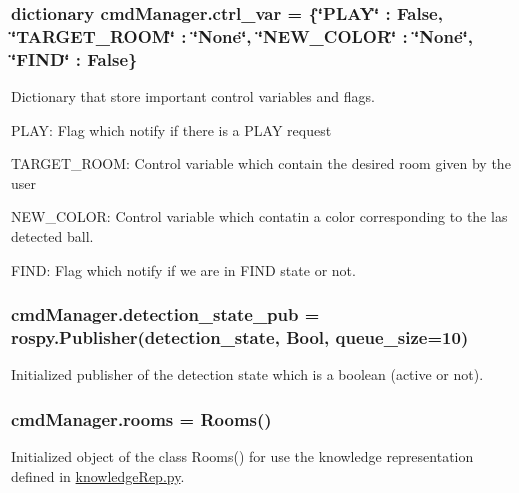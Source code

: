 \subsubsection[{\texorpdfstring{ctrl\+\_\+var}{ctrl_var}}]{\setlength{\rightskip}{0pt plus 5cm}dictionary cmd\+Manager.\+ctrl\+\_\+var = \{\char`\"{}P\+L\+AY\char`\"{} \+: False, \char`\"{}T\+A\+R\+G\+E\+T\+\_\+\+R\+O\+OM\char`\"{} \+: \char`\"{}None\char`\"{}, \char`\"{}N\+E\+W\+\_\+\+C\+O\+L\+OR\char`\"{} \+: \char`\"{}None\char`\"{}, \char`\"{}F\+I\+ND\char`\"{} \+: False\}}\hypertarget{namespacecmdManager_a927e4211865b745599afe42e9e8d7c8e}{}\label{namespacecmdManager_a927e4211865b745599afe42e9e8d7c8e}


Dictionary that store important control variables and flags. 


\begin{DoxyItemize}
\item P\+L\+AY\+: Flag which notify if there is a P\+L\+AY request
\item T\+A\+R\+G\+E\+T\+\_\+\+R\+O\+OM\+: Control variable which contain the desired room given by the user
\item N\+E\+W\+\_\+\+C\+O\+L\+OR\+: Control variable which contatin a color corresponding to the las detected ball.
\item F\+I\+ND\+: Flag which notify if we are in F\+I\+ND state or not. 
\end{DoxyItemize}
\subsubsection[{\texorpdfstring{detection\+\_\+state\+\_\+pub}{detection_state_pub}}]{\setlength{\rightskip}{0pt plus 5cm}cmd\+Manager.\+detection\+\_\+state\+\_\+pub = rospy.\+Publisher(\textquotesingle{}detection\+\_\+state\textquotesingle{}, Bool, queue\+\_\+size=10)}\hypertarget{namespacecmdManager_a441b40512edb5f87f3aede896640f5b4}{}\label{namespacecmdManager_a441b40512edb5f87f3aede896640f5b4}


Initialized publisher of the detection state which is a boolean (active or not). 

\subsubsection[{\texorpdfstring{rooms}{rooms}}]{\setlength{\rightskip}{0pt plus 5cm}cmd\+Manager.\+rooms = {\bf Rooms}()}\hypertarget{namespacecmdManager_a783b0ef84682af39dc9f2b8e828c4ad9}{}\label{namespacecmdManager_a783b0ef84682af39dc9f2b8e828c4ad9}


Initialized object of the class Rooms() for use the knowledge representation defined in \hyperlink{knowledgeRep_8py}{knowledge\+Rep.\+py}. 

